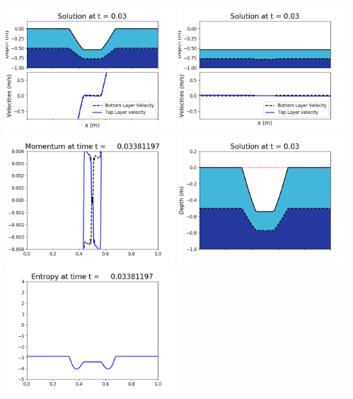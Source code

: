 \documentclass[11pt]{article}
\begin{document}
\vskip 10pt 
\includegraphics[width=0.475\textwidth]{frame0097fig1001.png}
\includegraphics[width=0.475\textwidth]{frame0097fig1002.png}
\vskip 10pt 
\includegraphics[width=0.475\textwidth]{frame0097fig1003.png}
\includegraphics[width=0.475\textwidth]{frame0097fig1006.png}
\vskip 10pt 
\includegraphics[width=0.475\textwidth]{frame0097fig1007.png}
\end{document}
